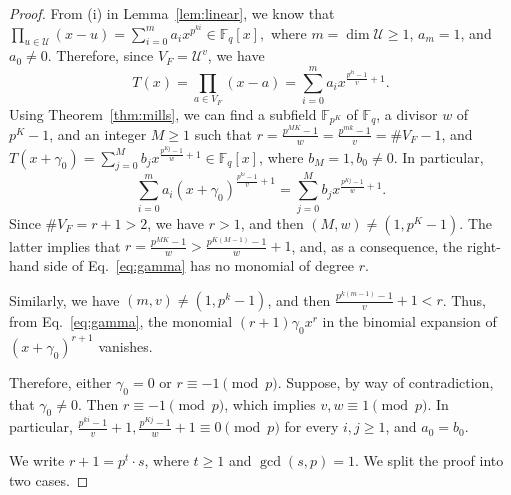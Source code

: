 \documentclass[11pt]{amsart}
\newcommand{\F}{\mathbb{F}}
\theoremstyle{definition}
\theoremstyle{remark}
\begin{document}
 
 \begin{proof}
From (i) in Lemma~\ref{lem:linear}, we know that   
$\prod_{u\in \mathcal U}(x-u)=\sum_{i=0}^{m}a_ix^{p^{ki}} \in \F_q[x],$
where  $m=\dim \mathcal U\geq 1$,  $a_m=1$, and $a_0\ne 0$. Therefore, since   $ V_F=\mathcal U^v$, we have  
$$T(x)=\prod_{a\in V_F}(x-a)=\sum_{i=0}^{m}a_ix^{\frac{p^{ki}-1}{v}+1}.$$
Using Theorem~\ref{thm:mills}, we can find a subfield $\F_{p^K}$ of $\F_q$, a divisor $w$ of $p^{K}-1$, and an integer $M\geq 1$ such that $r=\frac{p^{MK}-1}{w}=\frac{p^{mk}-1}{v}=\#V_F-1$, and
 $T(x+\gamma_0)=\sum_{j=0}^{M}b_jx^{\frac{p^{Kj}-1}{w}+1} \in \F_q[x]$, where $b_M=1, b_0\ne 0$. In particular, 
  \begin{equation}\label{eq:gamma}\sum_{i=0}^{m}a_i (x+\gamma_0)^{\frac{p^{ki}-1}{v}+1}=\sum_{j=0}^{M}b_jx^{\frac{p^{Kj}-1}{w}+1}.\end{equation} 
Since $\#V_F=r+1>2$, we have $r>1$, and then  $(M, w)\ne (1, p^K-1)$. The latter implies that $r=\frac{p^{MK}-1}{w}>\frac{p^{K(M-1)}-1}{w}+1$, and,  as a consequence, the right-hand side of Eq.~\eqref{eq:gamma} has no monomial of degree $r$.


Similarly, we have $(m, v)\ne (1, p^k-1)$, and then $\frac{p^{k(m-1)}-1}{v} +1<r$. Thus, from Eq.~\eqref{eq:gamma}, the monomial $(r+1)\gamma_0 x^r$ in the binomial expansion of $(x+\gamma_0)^{r+1}$ vanishes.

Therefore, either $\gamma_0=0$ or $r\equiv -1\pmod p$. Suppose, by way of contradiction, that $\gamma_0\ne 0$. Then $r\equiv -1\pmod p$, which implies $v, w\equiv 1\pmod p$. In particular, $\frac{p^{ki}-1}{v}+1, \frac{p^{Kj}-1}{w}+1\equiv 0\pmod p$ for every $i, j\ge1$, and $a_0=b_0$.

We write $r+1=p^t\cdot s$, where $t\ge 1$ and $\gcd(s, p)=1$. We  split the proof into two cases.
 


\end{proof}
\end{document}
